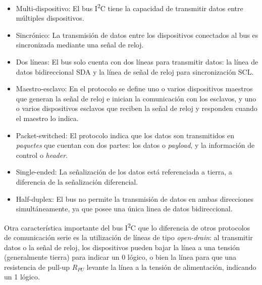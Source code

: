 \begin{itemize}
    \item {\Medium Multi-dispositivo:} El bus I\textsuperscript{2}C tiene la capacidad de transmitir datos entre múltiples dispositivos.
    \item {\Medium Sincrónico:} La transmisión de datos entre los dispositivos conectados al bus es sincronizada mediante una señal de reloj.
    \item {\Medium Dos líneas:} El bus solo cuenta con dos líneas para transmitir datos: la línea de datos bidireccional SDA y la línea de señal de reloj para sincronización SCL.
    \item {\Medium Maestro-esclavo:} En el protocolo se define uno o varios dispositivos maestros que generan la señal de reloj e inician la comunicación con los esclavos, y uno o varios dispositivos esclavos que reciben la señal de reloj y responden cuando el maestro lo indica.
    \item {\Medium Packet-switched:} El protocolo indica que los datos son transmitidos en \textit{paquetes} que cuentan con dos partes: los datos o \textit{payload}, y la información de control o \textit{header}.
    \item {\Medium Single-ended:} La señalización de los datos está referenciada a tierra, a diferencia de la señalización diferencial.
    \item {\Medium Half-duplex:} El bus no permite la transmisión de datos en ambas direcciones simultáneamente, ya que posee una única linea de datos bidireccional.\\
\end{itemize}

Otra característica importante del bus I\textsuperscript{2}C que lo diferencia de otros protocolos de comunicación serie es la utilización de {\Medium líneas de tipo \textit{open-drain}}: al transmitir datos o la señal de reloj, los dispositivos pueden bajar la línea a una tensión (generalmente tierra) para indicar un 0 lógico, o bien  la línea para que una resistencia de pull-up $R_{PU}$ levante la línea a la tensión de alimentación, indicando un 1 lógico.\\

